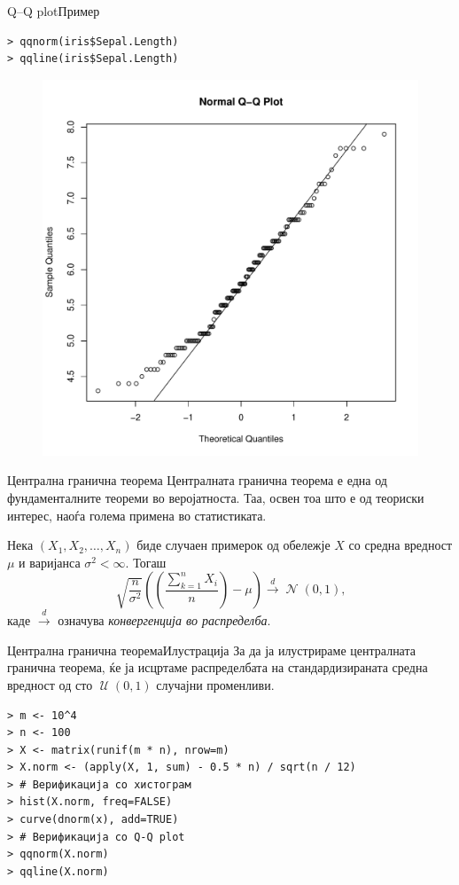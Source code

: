 \documentclass[hyperref={unicode}, xcolor={svgnames, table},
usepdftitle=false]{beamer}
\theoremstyle{remark}
\begin{document}
\begin{frame}[fragile]{Q--Q plot}{Пример}
\begin{verbatim}
> qqnorm(iris$Sepal.Length)
> qqline(iris$Sepal.Length)
\end{verbatim}
  \begin{figure}
    \centering
    \includegraphics[width=.5\textwidth]{QQ-norm_Sepal_Length.pdf}
  \end{figure}
\end{frame}

\begin{frame}{Централна гранична теорема}
  Централната гранична теорема е една од фундаменталните теореми во
  веројатноста.  Таа, освен тоа што е од теориски интерес, наоѓа голема примена
  во статистиката.
  \begin{theorem}
    Нека \((X_1, X_2, \ldots, X_n)\) биде случаен примерок од обележје \(X\) со
    средна вредност \(\mu\) и варијанса \(\sigma^2 < \infty\).  Тогаш
    \[
      \sqrt{\frac{n}{\sigma^2}} \left(\left(\frac{\sum\nolimits_{k = 1}^{n}
            X_i}{n}\right) - \mu\right) \xrightarrow{d}
      \operatorname{\mathcal{N}}(0, 1)\text{,}
    \]
    каде \(\xrightarrow{d}\) означува \emph{конвергенција во распределба}.
  \end{theorem}
\end{frame}

\begin{frame}[fragile]{Централна гранична теорема}{Илустрација}
  За да ја илустрираме централната гранична теорема, ќе ја исцртаме
  распределбата на стандардизираната средна вредност од сто
  \(\operatorname{\mathcal{U}}(0, 1)\) случајни променливи.
\begin{verbatim}
> m <- 10^4
> n <- 100
> X <- matrix(runif(m * n), nrow=m)
> X.norm <- (apply(X, 1, sum) - 0.5 * n) / sqrt(n / 12)
> # Верификација со хистограм
> hist(X.norm, freq=FALSE)
> curve(dnorm(x), add=TRUE)
> # Верификација со Q-Q plot
> qqnorm(X.norm)
> qqline(X.norm)
\end{verbatim}
\end{frame}
\end{document}
